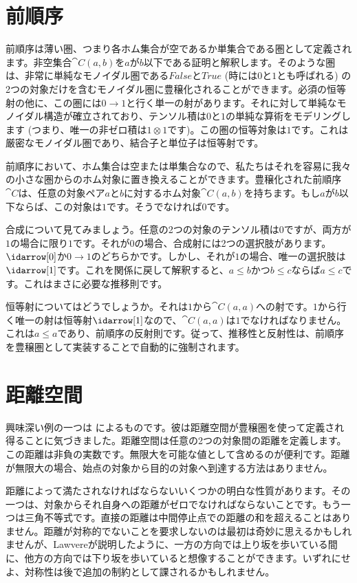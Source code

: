\section{前順序}

前順序は薄い圏、つまり各ホム集合が空であるか単集合である圏として定義されます。非空集合$\cat{C}(a, b)$を$a$が$b$以下である証明と解釈します。そのような圏は、非常に単純なモノイダル圏である$\mathit{False}$と$\mathit{True}$ (時には$0$と$1$とも呼ばれる) の2つの対象だけを含むモノイダル圏に豊穣化されることができます。必須の恒等射の他に、この圏には$0 \to 1$と行く単一の射があります。それに対して単純なモノイダル構造が確立されており、テンソル積は$0$と$1$の単純な算術をモデリングします (つまり、唯一の非ゼロ積は$1 \otimes 1$です)。この圏の恒等対象は$1$です。これは厳密なモノイダル圏であり、結合子と単位子は恒等射です。

前順序において、ホム集合は空または単集合なので、私たちはそれを容易に我々の小さな圏からのホム対象に置き換えることができます。豊穣化された前順序$\cat{C}$は、任意の対象ペア$a$と$b$に対するホム対象$\cat{C}(a, b)$を持ちます。もし$a$が$b$以下ならば、この対象は$1$です。そうでなければ$0$です。

合成について見てみましょう。任意の2つの対象のテンソル積は$0$ですが、両方が$1$の場合に限り$1$です。それが$0$の場合、合成射には2つの選択肢があります。$\idarrow[0]$か$0 \to 1$のどちらかです。しかし、それが$1$の場合、唯一の選択肢は$\idarrow[1]$です。これを関係に戻して解釈すると、$a \leqslant b$かつ$b \leqslant c$ならば$a \leqslant c$です。これはまさに必要な推移則です。

恒等射についてはどうでしょうか。それは$1$から$\cat{C}(a, a)$への射です。$1$から行く唯一の射は恒等射$\idarrow[1]$なので、$\cat{C}(a, a)$は$1$でなければなりません。これは$a \leqslant a$であり、前順序の反射則です。従って、推移性と反射性は、前順序を豊穣圏として実装することで自動的に強制されます。

\section{距離空間}

興味深い例の一つは
によるものです。彼は距離空間が豊穣圏を使って定義され得ることに気づきました。距離空間は任意の2つの対象間の距離を定義します。この距離は非負の実数です。無限大を可能な値として含めるのが便利です。距離が無限大の場合、始点の対象から目的の対象へ到達する方法はありません。

距離によって満たされなければならないいくつかの明白な性質があります。その一つは、対象からそれ自身への距離がゼロでなければならないことです。もう一つは三角不等式です。直接の距離は中間停止点での距離の和を超えることはありません。距離が対称的でないことを要求しないのは最初は奇妙に思えるかもしれませんが、Lawvereが説明したように、一方の方向では上り坂を歩いている間に、他方の方向では下り坂を歩いていると想像することができます。いずれにせよ、対称性は後で追加の制約として課されるかもしれません。

